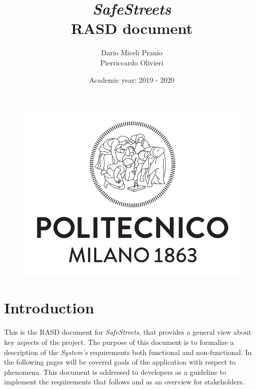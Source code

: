 \documentclass{article}
\title{
    \textbf{\textit{SafeStreets}} \\
    \textbf{RASD document}}
\date{Academic year: 2019 - 2020}
\author{
    Dario Miceli Pranio \\
    Pierriccardo Olivieri
}
\begin{document}

\maketitle

\begin{figure}[h!]
    \centering
    \includegraphics[scale=0.5]{img/logo.png}
\end{figure}

\newpage
{}
\tableofcontents

\newpage
\section{Introduction}
This is the RASD document for \textit{SafeStreets}, that provides a general view about key aspects of the project. 
The purpose of this document is to formalize a description of the \textit{System's} requirements both functional and non-functional. 
In the following pages will be covered goals of the application with respect to phenomena. This document is addressed to 
developers as a guideline to implement the requirements that follows and as an overview for stakeholders.
\end{document}

